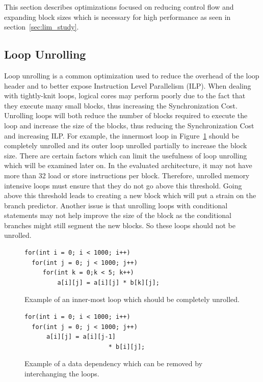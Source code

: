 This section describes optimizations focused on reducing control flow and expanding block sizes which is necessary for high performance as seen in section~\ref{sec:lim_study}.

\subsection{Loop Unrolling}
Loop unrolling is a common optimization used to reduce the overhead of the loop header and to better expose Instruction Level Parallelism (ILP).
When dealing with tightly-knit loops, logical cores may perform poorly due to the fact that they execute many small blocks, thus increasing the Synchronization Cost.
Unrolling loops will both reduce the number of blocks required to execute the loop and increase the size of the blocks, thus reducing the Synchronization Cost and increasing ILP.
For example, the innermost loop in Figure~\ref{lst:small} should be completely unrolled and its outer loop unrolled partially to increase the block size.
There are certain factors which can limit the usefulness of loop unrolling which will be examined later on.
In the evaluated architecture, it may not have more than 32 load or store instructions per block.
Therefore, unrolled memory intensive loops must ensure that they do not go above this threshold.
Going above this threshold leads to creating a new block which will put a strain on the branch predictor.
Another issue is that unrolling loops with conditional statements may not help improve the size of the block as the conditional branches might still segment the new blocks.
So these loops should not be unrolled.

\begin{figure}[t]
\lstset{language=C,numbersep=4pt,basicstyle=\small}
\begin{lstlisting}
for(int i = 0; i < 1000; i++)
  for(int j = 0; j < 1000; j++)
     for(int k = 0;k < 5; k++)
         a[i][j] = a[i][j] * b[k][j];
\end{lstlisting}
\caption{Example of an inner-most loop which should be completely unrolled.}
\label{lst:small}
\end{figure}

\begin{figure}[t]

\lstset{language=C,numbersep=4pt,basicstyle=\small}
\begin{lstlisting}
for(int i = 0; i < 1000; i++)
  for(int j = 0; j < 1000; j++)
      a[i][j] = a[i][j-1] 
                       * b[i][j];
\end{lstlisting}
\caption{Example of a data dependency which can be removed by interchanging the loops.}
\label{lst:dep}
\end{figure}


